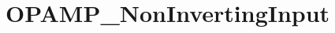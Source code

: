 \hypertarget{group___o_p_a_m_p___non_inverting_input}{\section{O\-P\-A\-M\-P\-\_\-\-Non\-Inverting\-Input}
\label{group___o_p_a_m_p___non_inverting_input}
}
